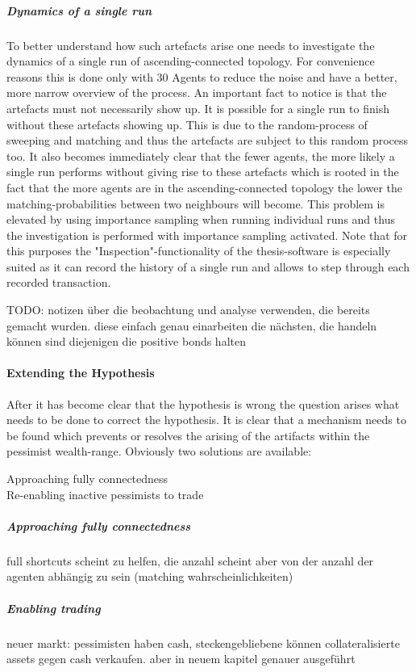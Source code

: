 \documentclass[Bachelorarbeit.tex]{subfiles}
\begin{document}
\subparagraph{Dynamics of a single run}
To better understand how such artefacts arise one needs to investigate the dynamics of a single run of ascending-connected topology. For convenience reasons this is done only with 30 Agents to reduce the noise and have a better, more narrow overview of the process.
\medskip 
An important fact to notice is that the artefacts must not necessarily show up. It is possible for a single run to finish without these artefacts showing up. This is due to the random-process of sweeping and matching and thus the artefacts are subject to this random process too. It also becomes immediately clear that the fewer agents, the more likely a single run performs without giving rise to these artefacts which is rooted in the fact that the more agents are in the ascending-connected topology the lower the matching-probabilities between two neighbours will become. This problem is elevated by using importance sampling when running individual runs and thus the investigation is performed with importance sampling activated.  Note that for this purposes the "Inspection"-functionality of the thesis-software is especially suited as it can record the history of a single run and allows to step through each recorded transaction.

TODO: notizen über die beobachtung und analyse verwenden, die bereits gemacht wurden. diese einfach genau einarbeiten die nächsten, die handeln können sind diejenigen die positive bonds halten
	
\paragraph{Extending the Hypothesis}
After it has become clear that the hypothesis is wrong the question arises what needs to be done to correct the hypothesis. It is clear that a mechanism needs to be found which prevents or resolves the arising of the artifacts within the pessimist wealth-range. Obviously two solutions are available:

\begin{tabbing}
Approaching fully connectedness \\
Re-enabling inactive pessimists to trade \\
\end{tabbing}

\subparagraph{Approaching fully connectedness}
	full shortcuts scheint zu helfen, die anzahl scheint aber von der anzahl der agenten abhängig zu sein (matching wahrscheinlichkeiten)
	
\subparagraph{Enabling trading}
	neuer markt: pessimisten haben cash, steckengebliebene können collateralisierte assets gegen cash verkaufen. aber in neuem kapitel genauer ausgeführt
\end{document}
